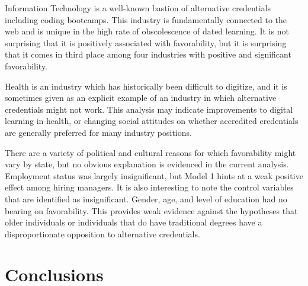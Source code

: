 \documentclass[review]{elsarticle}
\begin{document}
Information Technology is a well-known bastion of alternative credentials including coding bootcamps.
This industry is fundamentally connected to the web and is unique in the high rate of obscolescence of dated learning.
It is not surprising that it is positively associated with favorability,
but it is surprising that it comes in third place among four industries with positive and significant favorability.

Health is an industry which has historically been difficult to digitize,
and it is sometimes given as an explicit example of an industry in which alternative credentials
might not work. %
This analysis may indicate improvements to digital learning in health,
or changing social attitudes on whether accredited credentials are
generally preferred for many industry positions.

There are a variety of political and cultural reasons for which favorability might vary by state,
but no obvious explanation is evidenced in the current analysis.
Employment status was largely insignificant,
but Model 1 hints at a weak positive effect among hiring managers.
It is also interesting to note the control variables that are identified as insignificant.
Gender, age, and level of education had no bearing on favorability.
This provides weak evidence against the hypotheses that older individuals
or individuals that do have traditional degrees have a disproportionate opposition to alternative credentials.

\section{Conclusions}

\end{document}
